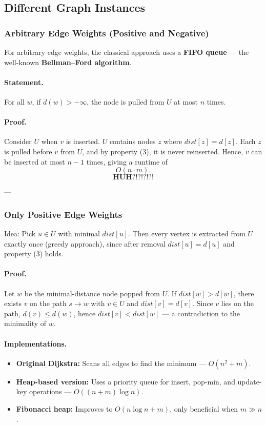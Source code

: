 \documentclass{article}
\begin{document}
\subsection{Different Graph Instances}

\subsubsection{Arbitrary Edge Weights (Positive and Negative)}

For arbitrary edge weights, the classical approach uses a \textbf{FIFO queue} — the well-known \textbf{Bellman–Ford algorithm}.

\paragraph{Statement.}  
For all $w$, if $d(w) > -\infty$, the node is pulled from $U$ at most $n$ times.

\paragraph{Proof.}  
Consider $U$ when $v$ is inserted.  
$U$ contains nodes $z$ where $dist[z] = d[z]$.  
Each $z$ is pulled before $v$ from $U$, and by property (3), it is never reinserted.  
Hence, $v$ can be inserted at most $n-1$ times, giving a runtime of  
\[
O(n \cdot m).
\]
\[\textbf{HUH?!?!?!?!}\]

---

\subsubsection{Only Positive Edge Weights}

Idea: Pick $u \in U$ with minimal $dist[u]$.  
Then every vertex is extracted from $U$ exactly once (greedy approach), since after removal $dist[u] = d[u]$ and property (3) holds.

\paragraph{Proof.}  
Let $w$ be the minimal-distance node popped from $U$.  
If $dist[w] > d[w]$, there exists $v$ on the path $s \to w$ with $v \in U$ and $dist[v] = d[v]$.  
Since $v$ lies on the path, $d(v) \leq d(w)$, hence $dist[v] < dist[w]$ — a contradiction to the minimality of $w$.

\paragraph{Implementations.}
\begin{itemize}
    \item \textbf{Original Dijkstra:} Scans all edges to find the minimum — $O(n^2 + m)$.
    \item \textbf{Heap-based version:} Uses a priority queue for insert, pop-min, and update-key operations — $O((n + m)\log n)$.
    \item \textbf{Fibonacci heap:} Improves to $O(n \log n + m)$, only beneficial when $m \gg n$.
\end{itemize}
\end{document}
